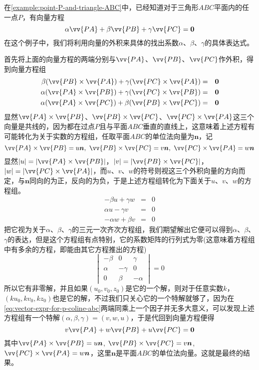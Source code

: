 \begin{example}
  \label{example:outer-product-coefficient-pa-pb-pc}
  在\autoref{example:point-P-and-triangle-ABC}中，已经知道对于三角形$ABC$平面内的任一点$P$，有向量方程
  \begin{equation}
    \label{eq:vector-expr-for-p-coline-abc}
   \alpha \vv{PA} + \beta \vv{PB} +\gamma \vv{PC} = \bm{0} 
  \end{equation}
  在这个例子中，我们将利用向量的外积来具体的找出系数$\alpha$、$\beta$、$\gamma$的具体表达式。

  首先将上面的向量方程的两端分别与$\vv{PA}$、$\vv{PB}$、$\vv{PC}$作外积，得到向量方程组
  \begin{eqnarray*}
    \beta (\vv{PB}\times\vv{PA}) + \gamma (\vv{PC}\times\vv{PA}) & = & \bm{0} \\
    \alpha (\vv{PA}\times\vv{PB}) + \gamma (\vv{PC}\times\vv{PB}) & = & \bm{0} \\
    \alpha (\vv{PA}\times\vv{PC}) + \beta (\vv{PB}\times\vv{PC}) & = & \bm{0}
  \end{eqnarray*}
  显然$\vv{PA}\times\vv{PB}$、$\vv{PB}\times\vv{PC}$、$\vv{PC}\times\vv{PA}$这三个向量是共线的，因为都在过点$P$且与平面$ABC$垂直的直线上，这意味着上述方程有可能转化为关于实数的方程组，任取平面$ABC$的单位法向量为$\bm{n}$，记
  \[ \vv{PA}\times\vv{PB}=u\bm{n}, \  \vv{PB}\times\vv{PC} = v\bm{n}, \  \vv{PC}\times\vv{PA}=w\bm{n} \]
  显然$|u|=|\vv{PA}\times\vv{PB}|$，$|v|=|\vv{PB}\times\vv{PC}|$，$|w|=|\vv{PC}\times\vv{PA}|$，而$u$、$v$、$w$的符号则视这三个外积向量的方向而定，与$\bm{n}$同向的为正，反向的为负，于是上述方程组转化为下面关于$u$、$v$、$w$的方程组。
  \begin{eqnarray*}
    -\beta u + \gamma w & = & 0 \\
    \alpha u - \gamma v & = & 0 \\
    - \alpha w + \beta v & = & 0
  \end{eqnarray*}
  把它视为关于$\alpha$、$\beta$、$\gamma$的三元一次齐次方程组，我们期望解出它便可以得到$\alpha$、$\beta$、$\gamma$的表达，但是这个方程组有点特别，它的系数矩阵的行列式为零(这意味着方程组中有多余的方程，即能由其它方程推出的方程)
  \[
    \begin{vmatrix}
      -\beta & 0 & \gamma \\
      \alpha & -\gamma & 0 \\
      0 & \beta & -\alpha
    \end{vmatrix}
    = 0
  \]
  所以它有非零解，并且如果$(u_0,v_0,z_0)$是它的一个解，则对于任意实数$k$，$(ku_0,kv_0,kz_0)$也是它的解，不过我们只关心它的一个特解就够了，因为在\autoref{eq:vector-expr-for-p-coline-abc}两端同乘上一个因子并无多大意义，可以发现上述方程组有一个特解$(\alpha,\beta,\gamma)=(v,w,u)$，于是代回到向量方程便得
  \[ v \vv{PA} + w \vv{PB} + u \vv{PC} = \bm{0} \]
  其中$\vv{PA}\times\vv{PB}=u\bm{n}$, $\vv{PB}\times\vv{PC}=v\bm{n}$, $\vv{PC}\times\vv{PA}=w\bm{n}$，这里$\bm{n}$是平面$ABC$的单位法向量。这就是最终的结果。


\end{example}
